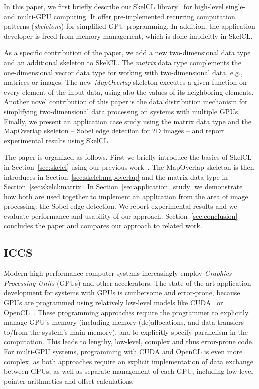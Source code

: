 In this paper, we first briefly describe our SkelCL library~\cite{SteuwerKeGo2011} for high-level single- and multi-GPU computing.
It offer pre-implemented recurring computation patterns (\emph{skeletons}) for simplified GPU programming.
In addition, the application developer is freed from memory management, which is done implicitly in SkelCL.

As a specific contribution of the paper, we add a new two-dimensional data type and an additional skeleton to SkelCL.
The \emph{matrix} data type complements the one-dimensional vector data type for working with two-dimensional data, e.g., matrices or images.
The new \emph{MapOverlap} skeleton executes a given function on every element of the input data, using also the values of its neighboring elements.
Another novel contribution of this paper is the data distribution mechanism for simplifying two-dimensional data processing on systems with multiple GPUs.
Finally, we present an application case study using the matrix data type and the MapOverlap skeleton -- Sobel edge detection for 2D images -- and report experimental results using SkelCL.

The paper is organized as follows.
First we briefly introduce the basics of SkelCL in Section~\ref{sec:skelcl} using our previous work~\cite{SteuwerKeGo2011}.
The MapOverlap skeleton is then introduces in Section~\ref{sec:skelcl:mapoverlap} and the matrix data type in Section~\ref{sec:skelcl:matrix}.
In Section~\ref{sec:application_study} we demonstrate how both are used together to implement an application from the area of image processing: the Sobel edge detection.
We report experimental results and we evaluate performance and usability of our approach.
Section~\ref{sec:conclusion} concludes the paper and compares our approach to related work.


\subsection{ICCS}
Modern high-performance computer systems increasingly employ \emph{Graphics Processing Units} (GPUs) and other accelerators.
The state-of-the-art application development for systems with GPUs is cumbersome and error-prone, because GPUs are programmed using relatively low-level models like CUDA~\cite{CUDAProgrammingGuide} or OpenCL~\cite{OpenCL}.
These programming approaches require the programmer to explicitly manage GPU's memory (including memory (de)allocations, and data transfers to/from the system's main memory), and to explicitly specify parallelism in the computation.
This leads to lengthy, low-level, complex and thus error-prone code.
For multi-GPU systems, programming with CUDA and OpenCL is even more complex, as both approaches require an explicit implementation of data exchange between GPUs, as well as separate management of each GPU, including low-level pointer arithmetics and offset calculations.

